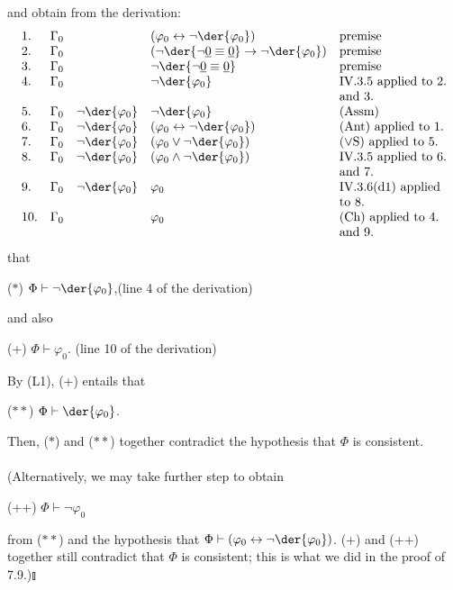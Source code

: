 \begin{enumerate}[1.]
\begin{center}
\begin{tabular}{l}
\end{tabular}
\end{center}
and obtain from the derivation:
\[
\begin{array}{lllll}
1. & \Gamma_0 & \ & (\varphi_0 \leftrightarrow \neg\der{\varphi_0}) & \mbox{premise} \cr
2. & \Gamma_0 & \ & (\neg\der{\neg\underline{0} \equiv \underline{0}} \rightarrow \neg\der{\varphi_0}) & \mbox{premise} \cr
3. & \Gamma_0 & \ & \neg\der{\neg\underline{0} \equiv \underline{0}} & \mbox{premise} \cr
4. & \Gamma_0 & \ & \neg\der{\varphi_0} & \mbox{IV.3.5 applied to 2.} \cr
\ & \ & \ & \ & \mbox{and 3.} \cr
5. & \Gamma_0 & \neg\der{\varphi_0} & \neg\der{\varphi_0} & \mbox{(Assm)} \cr
6. & \Gamma_0 & \neg\der{\varphi_0} & (\varphi_0 \leftrightarrow \neg\der{\varphi_0}) & \mbox{(Ant) applied to 1.} \cr
7. & \Gamma_0 & \neg\der{\varphi_0} & (\varphi_0 \lor \neg\der{\varphi_0}) & \mbox{($\lor$S) applied to 5.} \cr
8. & \Gamma_0 & \neg\der{\varphi_0} & (\varphi_0 \land \neg\der{\varphi_0}) & \mbox{IV.3.5 applied to 6.} \cr
\ & \ & \ & \ & \mbox{and 7.} \cr
9. & \Gamma_0 & \neg\der{\varphi_0} & \varphi_0 & \mbox{IV.3.6(d1) applied} \cr
\ & \ & \ & \ & \mbox{to 8.} \cr
10. & \Gamma_0 & \ & \varphi_0 & \mbox{(Ch) applied to 4.} \cr
\ & \ & \ & \ & \mbox{and 9.}
\end{array}
\]
that
\begin{center}
($*$) \hfill $\Phi \vdash \neg\der{\varphi_0}$,\hfill (line 4 of the derivation)
\end{center}
and also
\begin{center}
(+) \hfill $\Phi \vdash \varphi_0$. \hfill (line 10 of the derivation)
\end{center}
By (L1), (+) entails that
\begin{center}
($**$) \hfill $\Phi \vdash \der{\varphi_0}$. \hfill \phantom{($**$)}
\end{center}
Then, ($*$) and ($**$) together contradict the hypothesis that $\Phi$ is consistent.\\
\ \\
(Alternatively, we may take further step to obtain
\begin{center}
(++) \hfill $\Phi \vdash \neg\varphi_0$ \hfill \phantom{(++)}
\end{center}
from ($**$) and the hypothesis that $\Phi \vdash (\varphi_0 \leftrightarrow \neg\der{\varphi_0})$. (+) and (++) together still contradict that $\Phi$ is consistent; this is what we did in the proof of 7.9.)\nolinebreak\hfill$\talloblong$
\\
\ \\

\end{enumerate}
